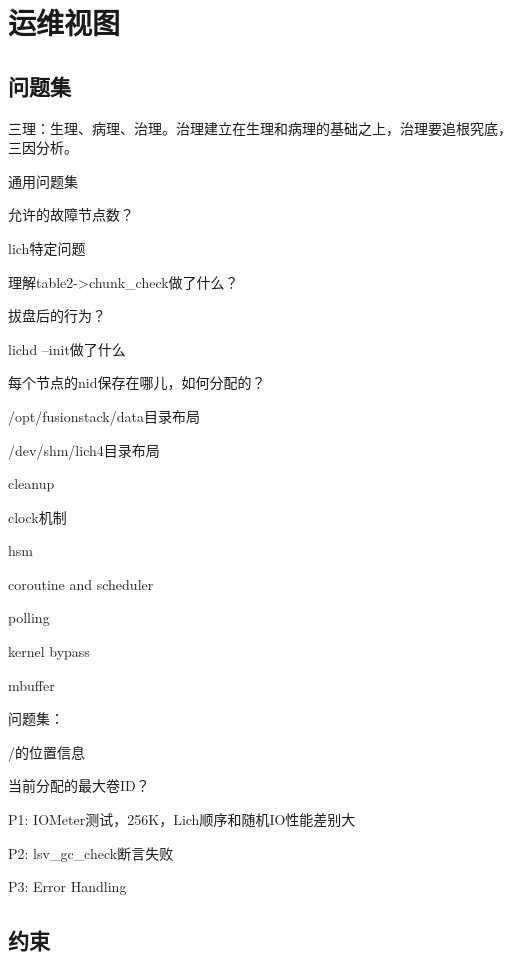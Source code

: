 \chapter{运维视图}

\section{问题集}

三理：生理、病理、治理。治理建立在生理和病理的基础之上，治理要追根究底，三因分析。

通用问题集
\begin{enumbox}
\item 允许的故障节点数？
\end{enumbox}

lich特定问题
\begin{enumbox}
\item 理解table2->chunk\_check做了什么？
\item 拔盘后的行为？
\item lichd --init做了什么
\item 每个节点的nid保存在哪儿，如何分配的？
\item /opt/fusionstack/data目录布局
\item /dev/shm/lich4目录布局
\item cleanup
\item clock机制
\item hsm
\end{enumbox}

\begin{compactitem}
\item coroutine and scheduler
\item polling 
\item kernel bypass
\item mbuffer
\end{compactitem}

问题集：
\begin{enumbox}
\item /的位置信息
\item 当前分配的最大卷ID？
\end{enumbox}

P1: IOMeter测试，256K，Lich顺序和随机IO性能差别大

P2: lsv\_gc\_check断言失败

P3: Error Handling

\section{约束}

